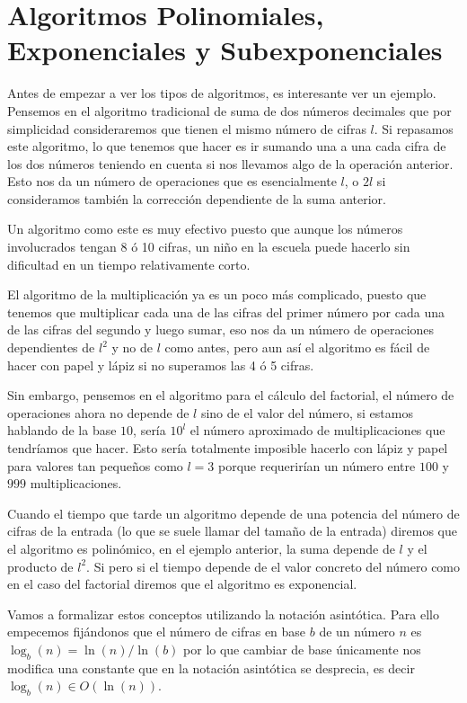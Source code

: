 \hfill
\section{Algoritmos Polinomiales, Exponenciales y Subexponenciales}

Antes de empezar a ver los tipos de algoritmos, es interesante ver un ejemplo. Pensemos en el algoritmo tradicional de suma de dos n\'umeros decimales que por simplicidad
consideraremos que tienen el mismo n\'umero de cifras $l$. Si repasamos este algoritmo, lo que tenemos que hacer es ir sumando una a una cada cifra de los dos n\'umeros teniendo
en cuenta si nos llevamos algo de la operaci\'on anterior. Esto nos da un n\'umero de operaciones que es esencialmente $l$, o $2l$ si consideramos tambi\'en la correcci\'on dependiente
de la suma anterior.

Un algoritmo como este es muy efectivo puesto que aunque los n\'umeros involucrados tengan 8 \'o 10 cifras, un ni\~no en la escuela puede hacerlo sin dificultad en un tiempo relativamente corto.

El algoritmo de la multiplicaci\'on ya es un poco m\'as complicado, puesto que tenemos que multiplicar cada una de las cifras del primer n\'umero por cada una de las cifras del segundo
y luego sumar, eso nos da un n\'umero de operaciones dependientes de $l^2$ y no de $l$ como antes, pero aun as\'i el algoritmo es f\'acil de hacer con papel y l\'apiz si no superamos
las 4 \'o 5 cifras.

Sin embargo, pensemos en el algoritmo para el c\'alculo del factorial, el n\'umero de operaciones ahora no depende de $l$ sino de el valor del n\'umero, si estamos hablando de la base $10$, ser\'ia
$10^l$ el n\'umero aproximado de multiplicaciones que tendr\'iamos que hacer. Esto ser\'ia totalmente imposible hacerlo con l\'apiz y papel para valores tan peque\~nos como $l = 3$
porque requerir\'ian un n\'umero entre $100$ y $999$ multiplicaciones.

Cuando el tiempo que tarde un algoritmo depende de una potencia del n\'umero de cifras de la entrada (lo que se suele llamar del tama\~no de la entrada) diremos que el algoritmo es polin\'omico, en el ejemplo anterior, la suma depende de $l$ y el producto de $l^2$.
Si pero si el tiempo depende de el valor concreto del n\'umero como en el caso del factorial diremos que el algoritmo es exponencial.

Vamos a formalizar estos conceptos utilizando la notaci\'on asint\'otica. Para ello empecemos fij\'andonos que el n\'umero de cifras en base $b$ de un n\'umero $n$ es
$\log_b(n) = \ln(n)/\ln(b)$ por lo que cambiar de base \'unicamente nos modifica una constante que en la notaci\'on asint\'otica se desprecia, es decir $\log_b(n) \in O(\ln(n))$.

